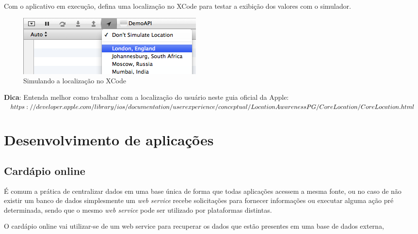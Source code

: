 \documentclass[a4paper,12pt,brazil,doubleside]{book}
\begin{document}
\begin{singlespace}
Com o aplicativo em execução, defina uma localização no XCode para testar a exibição dos valores com o simulador.

\begin{figure}[H]
  \centering
  \includegraphics[width=.75\textwidth]{figuras/location.png}
  \caption{Simulando a localização no XCode}
  \label{fig:a}
\end{figure}

\begin{framed}

\textbf{Dica}: Entenda melhor como trabalhar com a localização do usuário neste guia oficial da Apple:\\
\(https://developer.apple.com/library/ios/documentation/userexperience/conceptual/\\LocationAwarenessPG/CoreLocation/CoreLocation.html\)
\end{framed}

\chapter{Desenvolvimento de aplicações}

\section{Cardápio online}
É comum a prática de centralizar dados em uma base única de forma que todas aplicações acessem a mesma fonte, ou no caso de não existir um banco de dados simplesmente um \emph{web service} recebe solicitações para fornecer informações ou executar alguma ação pré determinada, sendo que o mesmo \emph{web service} pode ser utilizado por plataformas distintas.

O cardápio online vai utilizar-se de um web service para recuperar os dados que estão presentes em uma base de dados externa,


\end{singlespace}
\end{document}
